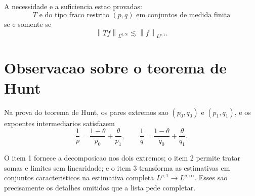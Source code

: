 \documentclass[12pt,a4paper]{article}
\newcommand{\norm}[2]{\left\|#1\right\|_{#2}}
\begin{document}
A necessidade e a suficiencia estao provadas:
\[
T\text{ e do tipo fraco restrito }(p,q)\text{ em conjuntos de medida finita}
\]
se e somente se
\[
\norm{Tf}{L^{q,\infty}}\lesssim\norm{f}{L^{p,1}}.
\]

\section*{Observacao sobre o teorema de Hunt}

Na prova do teorema de Hunt, os pares extremos sao $(p_0,q_0)$ e $(p_1,q_1)$,
e os expoentes intermediarios satisfazem
\[
\frac1p=\frac{1-\theta}{p_0}+\frac{\theta}{p_1},
\qquad
\frac1q=\frac{1-\theta}{q_0}+\frac{\theta}{q_1}.
\]

O item 1 fornece a decomposicao nos dois extremos; o item 2 permite tratar
somas e limites sem linearidade; e o item 3 transforma as estimativas em
conjuntos caracteristicos na estimativa completa $L^{p,1}\to L^{q,\infty}$.
Esses sao precisamente os detalhes omitidos que a lista pede completar.
\end{document}
